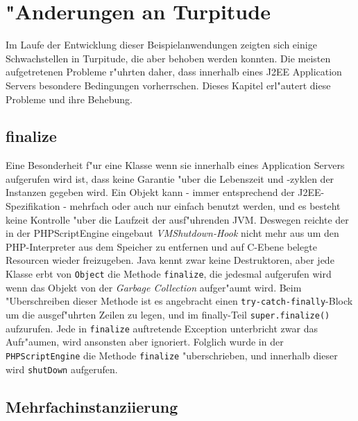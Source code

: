 \section{"Anderungen an Turpitude}
\label{sec:chap2:turp}

Im Laufe der Entwicklung dieser Beispielanwendungen zeigten sich einige Schwachstellen in
Turpitude, die aber behoben werden konnten. Die meisten aufgetretenen Probleme r"uhrten daher,
dass innerhalb eines J2EE Application Servers besondere Bedingungen vorherrschen.
Dieses Kapitel erl"autert diese Probleme und ihre Behebung.

\subsection{finalize}
\label{sec:chap2:turp:final}

Eine Besonderheit f"ur eine Klasse wenn sie innerhalb eines Application Servers aufgerufen wird
ist, dass keine Garantie "uber die Lebenszeit und -zyklen der Instanzen gegeben wird. Ein Objekt kann
- immer entsprechend der J2EE-Spezifikation - mehrfach oder auch nur einfach benutzt werden, und
es besteht keine Kontrolle "uber die Laufzeit der ausf"uhrenden JVM.
Deswegen reichte der in der PHPScriptEngine eingebaut \emph{VMShutdown-Hook} nicht mehr aus um
den PHP-Interpreter aus dem Speicher zu entfernen und auf C-Ebene belegte Resourcen wieder
freizugeben. Java kennt zwar keine Destruktoren, aber jede Klasse erbt von \texttt{Object} die
Methode \texttt{finalize}, die jedesmal aufgerufen wird wenn das Objekt von der \emph{Garbage Collection}
aufger"aumt wird. 
Beim "Uberschreiben dieser Methode ist es angebracht einen \texttt{try-catch-finally}-Block
um die ausgef"uhrten Zeilen zu legen, und im finally-Teil \texttt{super.finalize()} aufzurufen.
Jede in \texttt{finalize} auftretende Exception unterbricht zwar das Aufr"aumen, wird ansonsten
aber ignoriert.
Folglich wurde in der \texttt{PHPScriptEngine} die Methode \texttt{finalize} "uberschrieben, und innerhalb dieser
wird \texttt{shutDown} aufgerufen.

\subsection{Mehrfachinstanziierung}
\label{sec:chap2:turp:multi}

